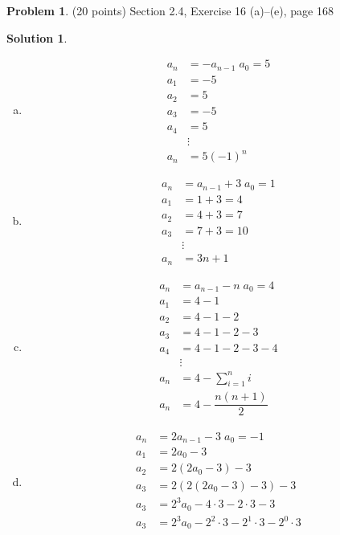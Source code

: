 \documentclass{article}
\theoremstyle{definition}
\newtheorem{problem}{Problem}
\newtheorem*{solution}{Solution}
\begin{document}
\begin{problem} (20 points)
Section 2.4, Exercise 16 (a)--(e), page 168
\end{problem}
\begin{solution}\ \\
\begin{enumerate}[a)]
  \item 
  \begin{align*}
    a_n &= -a_{n-1} \; a_0 = 5 \\
    a_1 &= -5 \\
    a_2 &=  5 \\
    a_3 &= -5 \\
    a_4 &= 5 \\
    &\vdots \\
    a_n &= 5(-1)^n
  \end{align*}
  \item 
  \begin{align*}
    a_n &= a_{n-1} + 3 \; a_0 = 1 \\
    a_1 &=  1 + 3 = 4 \\
    a_2 &=  4 + 3 = 7 \\
    a_3 &=  7 + 3 = 10 \\
    &\vdots \\
    a_n &= 3n + 1
  \end{align*}
  \item 
  \begin{align*}
    a_n &= a_{n-1} - n \; a_0 = 4 \\
    a_1 &= 4 - 1  \\
    a_2 &= 4 - 1 - 2 \\
    a_3 &= 4 - 1 - 2 - 3 \\
    a_4 &= 4 - 1 - 2 - 3 - 4 \\
    &\vdots \\
    a_n & = 4 - \sum_{i=1}^n i \\
        a_n & = 4 - \dfrac{n(n+1)}{2}
  \end{align*}
  \item 
  \begin{align*}
        a_n &= 2a_{n-1} - 3 \; a_0 = -1 \\
    a_1 &= 2a_0 - 3 \\
    a_2 &= 2(2a_0 - 3) - 3 \\
    a_3 &= 2(2(2a_0 - 3) - 3) - 3 \\
    a_3 &= 2^3 a_0 - 4 \cdot 3 - 2 \cdot 3 - 3\\
    a_3 &= 2^3 a_0 - 2^2 \cdot 3 - 2^1 \cdot 3 - 2^0 \cdot 3\\

\end{align*}
\end{enumerate}
\end{solution}
\end{document}
